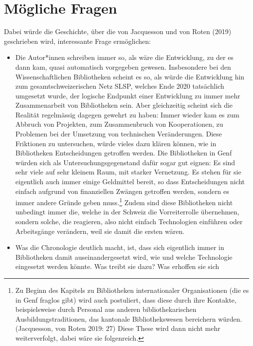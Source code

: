 \documentclass[a4paper,
fontsize=11pt,
oneside,
numbers=noperiodatend,
parskip=half-,
bibliography=totoc,
final
]{scrartcl}
\begin{document}
\hypertarget{muxf6gliche-fragen}{%
\section{Mögliche Fragen}\label{muxf6gliche-fragen}}

Dabei würde die Geschichte, über die von Jacquesson und von Roten (2019)
geschrieben wird, interessante Frage ermöglichen:

\begin{itemize}
\item
  Die Autor*innen schreiben immer so, als wäre die Entwicklung, zu der
  es dann kam, quasi automatisch vorgegeben gewesen. Insbesondere bei
  den Wissenschaftlichen Bibliotheken scheint es so, als würde die
  Entwicklung hin zum gesamtschweizerischen Netz SLSP, welches Ende 2020
  tatsächlich umgesetzt wurde, der logische Endpunkt einer Entwicklung
  zu immer mehr Zusammenarbeit von Bibliotheken sein. Aber gleichzeitig
  scheint sich die Realität regelmässig dagegen gewehrt zu haben: Immer
  wieder kam es zum Abbruch von Projekten, zum Zusammenbruch von
  Kooperationen, zu Problemen bei der Umsetzung von technischen
  Veränderungen. Diese Friktionen zu untersuchen, würde vieles dazu
  klären können, wie in Bibliotheken Entscheidungen getroffen werden.
  Die Bibliotheken in Genf würden sich als Untersuchungsgegenstand dafür
  sogar gut eignen: Es sind sehr viele auf sehr kleinem Raum, mit
  starker Vernetzung. Es stehen für sie eigentlich auch immer einige
  Geldmittel bereit, so dass Entscheidungen nicht einfach aufgrund von
  finanziellen Zwängen getroffen werden, sondern es immer andere Gründe
  geben muss.\footnote{Zu Beginn des Kapitels zu Bibliotheken
    internationaler Organisationen (die es in Genf fraglos gibt) wird
    auch postuliert, dass diese durch ihre Kontakte, beispielsweise
    durch Personal aus anderen bibliothekarischen
    Ausbildungstraditionen, das kantonale Bibliothekswesen bereichern
    würden. (Jacquesson, von Roten 2019: 27) Diese These wird dann nicht
    mehr weiterverfolgt, dabei wäre sie folgenreich.} Zudem sind diese
  Bibliotheken nicht unbedingt immer die, welche in der Schweiz die
  Vorreiterrolle übernehmen, sondern solche, die reagieren, also nicht
  einfach Technologien einführen oder Arbeitsgänge verändern, weil sie
  damit die ersten wären.
\item
  Was die Chronologie deutlich macht, ist, dass sich eigentlich immer in
  Bibliotheken damit auseinandergesetzt wird, wie und welche Technologie
  eingesetzt werden könnte. Was treibt sie dazu? Was erhoffen sie sich

\end{itemize}
\end{document}
